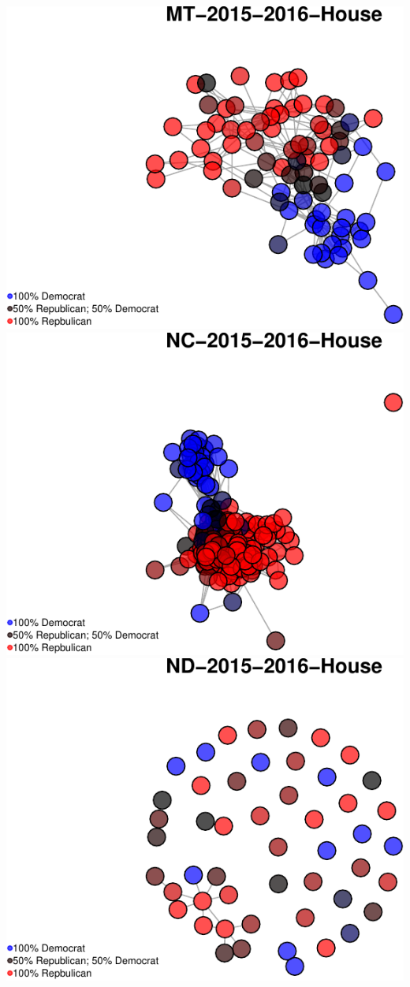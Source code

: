 \documentclass[]{article}
\begin{document}
\includegraphics{Final_Project_RMarkdown_Updated_files/figure-latex/unnamed-chunk-10-22.pdf}
\includegraphics{Final_Project_RMarkdown_Updated_files/figure-latex/unnamed-chunk-10-23.pdf}
\includegraphics{Final_Project_RMarkdown_Updated_files/figure-latex/unnamed-chunk-10-24.pdf}
\end{document}
